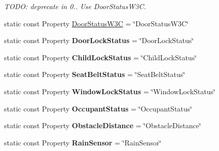 \begin{DoxyCompactItemize}
\begin{DoxyCompactList}\small\item\em T\-O\-D\-O\-: deprecate in 0.. Use Door\-Status\-W3\-C. \end{DoxyCompactList}\item 
static const Property \hyperlink{classVehicleProperty_a43535323827c54d73fe8e7b68f131f79}{Door\-Status\-W3\-C} = \char`\"{}Door\-Status\-W3\-C\char`\"{}
\item 
\hypertarget{classVehicleProperty_a3d6b7274ee30b454864351c1c91bf694}{static const Property {\bfseries Door\-Lock\-Status} = \char`\"{}Door\-Lock\-Status\char`\"{}}\label{classVehicleProperty_a3d6b7274ee30b454864351c1c91bf694}

\item 
\hypertarget{classVehicleProperty_a8da7bc1ecdd1b8d0ca6e96a708b00ab2}{static const Property {\bfseries Child\-Lock\-Status} = \char`\"{}Child\-Lock\-Status\char`\"{}}\label{classVehicleProperty_a8da7bc1ecdd1b8d0ca6e96a708b00ab2}

\item 
\hypertarget{classVehicleProperty_a6189236af616f7e8326ccb1b45d005c4}{static const Property {\bfseries Seat\-Belt\-Status} = \char`\"{}Seat\-Belt\-Status\char`\"{}}\label{classVehicleProperty_a6189236af616f7e8326ccb1b45d005c4}

\item 
\hypertarget{classVehicleProperty_aa2db4c5710bc329bf294102a628e7c37}{static const Property {\bfseries Window\-Lock\-Status} = \char`\"{}Window\-Lock\-Status\char`\"{}}\label{classVehicleProperty_aa2db4c5710bc329bf294102a628e7c37}

\item 
\hypertarget{classVehicleProperty_a581909689c6ad9ffea21a4de61109150}{static const Property {\bfseries Occupant\-Status} = \char`\"{}Occupant\-Status\char`\"{}}\label{classVehicleProperty_a581909689c6ad9ffea21a4de61109150}

\item 
\hypertarget{classVehicleProperty_a0b3f901f17dd92086b59a1923b9124c4}{static const Property {\bfseries Obstacle\-Distance} = \char`\"{}Obstacle\-Distance\char`\"{}}\label{classVehicleProperty_a0b3f901f17dd92086b59a1923b9124c4}

\item 
\hypertarget{classVehicleProperty_aaf332f3700a7dabc3ebe138c8442c854}{static const Property {\bfseries Rain\-Sensor} = \char`\"{}Rain\-Sensor\char`\"{}}\label{classVehicleProperty_aaf332f3700a7dabc3ebe138c8442c854}


\end{DoxyCompactItemize}
